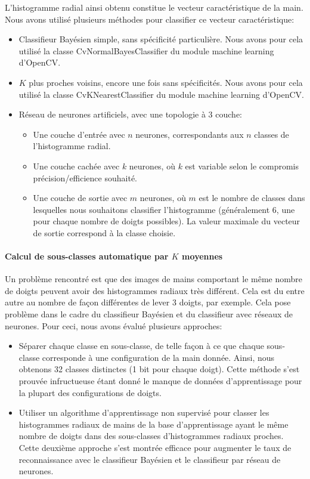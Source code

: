 L'histogramme radial ainsi obtenu constitue le vecteur caractéristique de la main. Nous avons utilisé plusieurs méthodes pour classifier ce vecteur caractéristique:

\begin{itemize}
\item Classifieur Bayésien simple, sans spécificité particulière. Nous avons pour cela utilisé la classe CvNormalBayesClassifier du module machine learning d'OpenCV.
\item $K$ plus proches voisins, encore une fois sans spécificités. Nous avons pour cela utilisé la classe CvKNearestClassifier du module machine learning d'OpenCV.
\item Réseau de neurones artificiels, avec une topologie à $3$ couche:

\begin{itemize}
\item Une couche d'entrée avec $n$ neurones, correspondants aux $n$ classes de l'histogramme radial.
\item Une couche cachée avec $k$ neurones, où $k$ est variable selon le compromis précision/efficience souhaité.
\item Une couche de sortie avec $m$ neurones, où $m$ est le nombre de classes dans lesquelles nous souhaitons classifier l'histogramme (généralement 6, une pour chaque nombre de doigts possibles). La valeur maximale du vecteur de sortie correspond à la classe choisie.
\end{itemize}
\end{itemize}

\paragraph{Calcul de sous-classes automatique par $K$ moyennes}
Un problème rencontré est que des images de mains comportant le même nombre de doigts peuvent avoir des histogrammes radiaux très différent. Cela est du entre autre au nombre de façon différentes de lever 3 doigts, par exemple. Cela pose problème dans le cadre du classifieur Bayésien et du classifieur avec réseaux de neurones. Pour ceci, nous avons évalué plusieurs approches:

\begin{itemize}
\item Séparer chaque classe en sous-classe, de telle façon à ce que chaque sous-classe corresponde à une configuration de la main donnée. Ainsi, nous obtenons 32 classes distinctes (1 bit pour chaque doigt). Cette méthode s'est prouvée infructueuse étant donné le manque de données d'apprentissage pour la plupart des configurations de doigts.
\item Utiliser un algorithme d'apprentissage non supervisé pour classer les histogrammes radiaux de mains de la base d'apprentissage ayant le même nombre de doigts dans des sous-classes d'histogrammes radiaux proches. Cette deuxième approche s'est montrée efficace pour augmenter le taux de reconnaissance avec le classifieur Bayésien et le classifieur par réseau de neurones.
\end{itemize}

